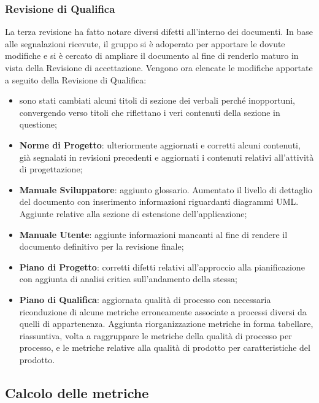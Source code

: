 \subsubsection{Revisione di Qualifica}
La terza revisione ha fatto notare diversi difetti all'interno dei documenti.
In base alle segnalazioni ricevute, il gruppo si è adoperato per apportare le dovute modifiche e si è cercato di ampliare il documento al fine di renderlo maturo in vista della Revisione di accettazione. Vengono ora elencate le modifiche apportate a seguito della Revisione di Qualifica:
\begin{itemize}
	\item sono stati cambiati alcuni titoli di sezione dei verbali perché inopportuni, convergendo verso titoli che riflettano i veri contenuti della sezione in questione;
	\item \textbf{Norme di Progetto}: ulteriormente aggiornati e corretti alcuni contenuti, già segnalati in revisioni precedenti e aggiornati i contenuti relativi all'attività di progettazione;
	\item \textbf{Manuale Sviluppatore}: aggiunto glossario. Aumentato il livello di dettaglio del documento con inserimento informazioni riguardanti diagrammi UML. Aggiunte relative alla sezione di estensione dell'applicazione;
	\item \textbf{Manuale Utente}: aggiunte informazioni mancanti al fine di rendere il documento definitivo per la revisione finale;
	\item \textbf{Piano di Progetto}: corretti difetti relativi all'approccio alla pianificazione con aggiunta di analisi critica sull'andamento della stessa;
	\item \textbf{Piano di Qualifica}: aggiornata qualità di processo con necessaria riconduzione di alcune metriche erroneamente associate a processi diversi da quelli di appartenenza. Aggiunta riorganizzazione metriche in forma tabellare, riassuntiva, volta a raggruppare le metriche della qualità di processo per processo, e le metriche relative alla qualità di prodotto per caratteristiche del prodotto.
\end{itemize}

\subsection{Calcolo delle metriche}
